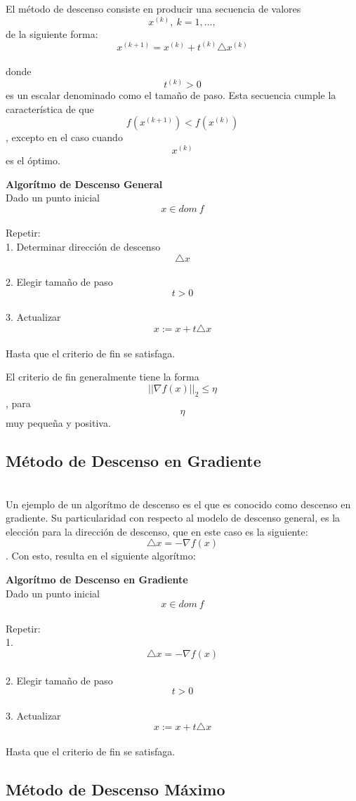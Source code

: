 \documentclass[]{article}
\begin{document}
El método de descenso consiste en producir una secuencia de valores
\[x^{(k)}, \ k=1,...,\] de la siguiente forma:\\
\[x^{(k+1)}= x^{(k)}+t^{(k)}\triangle x^{(k)}\]\\
donde \[t^{(k)} > 0\] es un escalar denominado como el tamaño de paso.
Esta secuencia cumple la característica de que
\[f(x^{(k+1)})<f(x^{(k)})\], excepto en el caso cuando \[x^{(k)}\] es el
óptimo.

\textbf{Algorítmo de Descenso General}\\
Dado un punto inicial \[x \in dom \ f\]\\
Repetir:\\
1. Determinar dirección de descenso \[\triangle x\]\\
2. Elegir tamaño de paso \[t>0\]\\
3. Actualizar \[x:=x+ t \triangle x\]\\
Hasta que el criterio de fin se satisfaga.

El criterio de fin generalmente tiene la forma
\[||\nabla f(x)||_2 \leq \eta\], para \[\eta\] muy pequeña y positiva.\\
\subsection{Método de Descenso en Gradiente}\\
Un ejemplo de un algorítmo de descenso es el que es conocido como
descenso en gradiente. Su particularidad con respecto al modelo de
descenso general, es la elección para la dirección de descenso, que en
este caso es la siguiente:\\
\[\triangle x = - \nabla f(x)\]. Con esto, resulta en el siguiente
algorítmo:

\textbf{Algorítmo de Descenso en Gradiente}\\
Dado un punto inicial \[x \in dom \ f\]\\
Repetir:\\
1. \[\triangle x = - \nabla f(x)\]\\
2. Elegir tamaño de paso \[t>0\]\\
3. Actualizar \[x:=x+ t \triangle x\]\\
Hasta que el criterio de fin se satisfaga.

\subsection{Método de Descenso Máximo}
\end{document}

